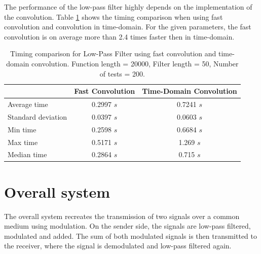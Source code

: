 \documentclass[12pt, a4paper]{report}
\begin{document}
The performance of the low-pass filter highly depends on the implementation of the convolution.
Table \ref{tab:timing_comparison} shows the timing comparison when using fast convolution and convolution in time-domain.
For the given parameters, the fast convolution is on average more than 2.4 times faster then in time-domain.
\begin{table}[h!]
	\centering
	\begin{tabular}{|l|c|c|}
		\hline
		                   & \textbf{Fast Convolution} & \textbf{Time-Domain Convolution} \\ \hline
		Average time       & 0.2997 \(s\)              & 0.7241 \(s\)                     \\ \hline
		Standard deviation & 0.0397 \(s\)              & 0.0603 \(s\)                     \\ \hline
		Min time           & 0.2598 \(s\)              & 0.6684 \(s\)                     \\ \hline
		Max time           & 0.5171 \(s\)              & 1.269 \(s\)                      \\ \hline
		Median time        & 0.2864 \(s\)              & 0.715 \(s\)                      \\ \hline
	\end{tabular}
	\caption{Timing comparison for Low-Pass Filter using fast convolution and time-domain convolution. Function length = 20000, Filter length = 50, Number of tests = 200.}
	\label{tab:timing_comparison}
\end{table}

\chapter{Overall system}

The overall system recreates the transmission of two signals over a common medium using modulation.
On the sender side, the signals are low-pass filtered, modulated and added.
The sum of both modulated signals is then transmitted to the receiver,
where the signal is demodulated and low-pass filtered again.
\end{document}

